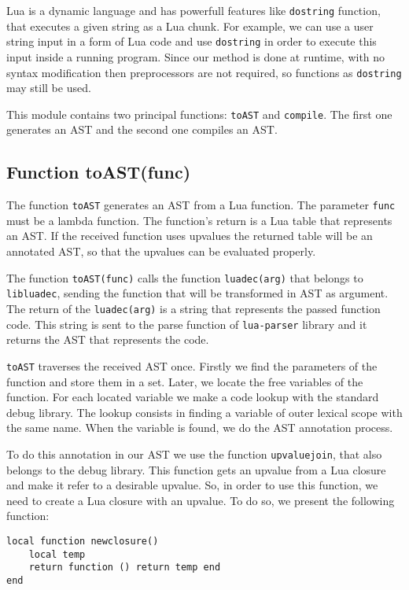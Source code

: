 \documentclass[english]{llncs}
\begin{document}
Lua is a dynamic language and has powerfull features like \texttt{dostring} function, that executes a given string as a Lua chunk.
For example, we can use a user string input in a form of Lua code and use \texttt{dostring} in order to execute this input inside a running program.
Since our method is done at runtime, with no syntax modification then preprocessors are not required, so functions as \texttt{dostring} may still be used.



This module contains two principal functions: \texttt{toAST} and \texttt{compile}.
The first one generates an AST and the second one compiles an AST.

\subsection{Function toAST(func) }


The function \texttt{toAST} generates an AST from a Lua function.
The parameter \texttt{func} must be a lambda function.
The function's return is a Lua table that represents an AST.
If the received function uses upvalues the returned table will be an annotated AST, so that the upvalues can be evaluated properly.

The function \texttt{toAST(func)} calls the function \texttt{luadec(arg)} that belongs to \texttt{libluadec}, sending the function that will be transformed in AST as argument.
The return of the \texttt{luadec(arg)} is a string that represents the passed function code.
This string is sent to the parse function of \texttt{lua-parser} library and it returns the AST that represents the code.

\texttt{toAST} traverses the received AST once.
Firstly we find the parameters of the function and store them in a set.
Later, we locate the free variables of the function.
For each located variable we make a code lookup with the standard debug library.
The lookup consists in finding a variable of outer lexical scope with the same name.
When the variable is found, we do the AST annotation process.

To do this annotation in our AST we use the function \texttt{upvaluejoin}, that also belongs to the debug library.
This function gets an upvalue from a Lua closure and make it refer to a desirable upvalue.
So, in order to use this function, we need to create a Lua closure with an upvalue.
To do so, we present the following function:


\begin{verbatim}
local function newclosure()
    local temp
    return function () return temp end
end
\end{verbatim}
\end{document}

